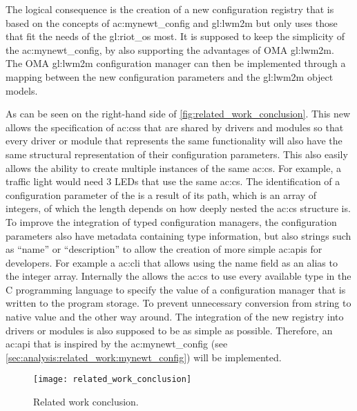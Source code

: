 The logical consequence is the creation of a new configuration registry that is based on the concepts of \gls{ac:mynewt_config} and \gls{gl:lwm2m} but only uses those that fit the needs of the \gls{gl:riot_os} most.
It is supposed to keep the simplicity of the \gls{ac:mynewt_config}, by also supporting the advantages of OMA \gls{gl:lwm2m}.
The OMA \gls{gl:lwm2m} configuration manager can then be implemented through a mapping between the new  configuration parameters and the \gls{gl:lwm2m} object models.

As can be seen on the right-hand side of \autoref{fig:related_work_conclusion}.
This new  allows the specification of \glspl{ac:cs} that are shared by drivers and modules so that every driver or module that represents the same functionality will also have the same structural representation of their configuration parameters.
This also easily allows the ability to create multiple instances of the same \gls{ac:cs}.
For example, a traffic light would need 3 LEDs that use the same \gls{ac:cs}.
The identification of a configuration parameter of the  is a result of its path, which is an array of integers, of which the length depends on how deeply nested the \gls{ac:cs} structure is.
To improve the integration of typed configuration managers, the configuration parameters also have metadata containing type information, but also strings such as ``name'' or ``description'' to allow the creation of more simple \glspl{ac:api} for developers.
For example a \gls{ac:cli} that allows using the name field as an alias to the integer array.
Internally the  allows the \gls{ac:cs} to use every available type in the C programming language to specify the value of a configuration manager that is written to the program storage.
To prevent unnecessary conversion from string to native value and the other way around. The integration of the new registry into drivers or modules is also supposed to be as simple as possible.
Therefore, an \gls{ac:api} that is inspired by the \gls{ac:mynewt_config} (see \autoref{sec:analysis:related_work:mynewt_config}) will be implemented.

\begin{figure}[H]
      \centering
      \texttt{[image: related\_work\_conclusion]}
      \caption{Related work conclusion.}
      \label{fig:related_work_conclusion}
\end{figure}
